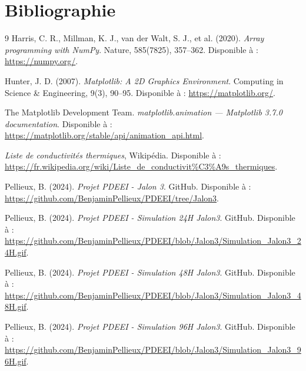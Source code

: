 \documentclass[a4paper,11pt]{article}
\begin{document}
\section*{Bibliographie}
\begin{thebibliography}{9}
    Harris, C. R., Millman, K. J., van der Walt, S. J., et al. (2020). \textit{Array programming with NumPy}. Nature, 585(7825), 357–362. Disponible à : \url{https://numpy.org/}.
    
    Hunter, J. D. (2007). \textit{Matplotlib: A 2D Graphics Environment}. Computing in Science \& Engineering, 9(3), 90–95. Disponible à : \url{https://matplotlib.org/}.

    The Matplotlib Development Team. \textit{matplotlib.animation — Matplotlib 3.7.0 documentation}. Disponible à : \url{https://matplotlib.org/stable/api/animation_api.html}.
    
    \textit{Liste de conductivités thermiques}, Wikipédia. Disponible à : \\ \url{https://fr.wikipedia.org/wiki/Liste_de_conductivit%C3%A9s_thermiques}.
    
    Pellieux, B. (2024). \textit{Projet PDEEI - Jalon 3}. GitHub. Disponible à : \\ \url{https://github.com/BenjaminPellieux/PDEEI/tree/Jalon3}.

    Pellieux, B. (2024). \textit{Projet PDEEI - Simulation 24H Jalon3}. GitHub. Disponible à : \\ \url{https://github.com/BenjaminPellieux/PDEEI/blob/Jalon3/Simulation_Jalon3_24H.gif}.
    
    Pellieux, B. (2024). \textit{Projet PDEEI - Simulation 48H Jalon3}. GitHub. Disponible à : \\ \url{https://github.com/BenjaminPellieux/PDEEI/blob/Jalon3/Simulation_Jalon3_48H.gif}.
    
    Pellieux, B. (2024). \textit{Projet PDEEI - Simulation 96H Jalon3}. GitHub. Disponible à : \\ \url{https://github.com/BenjaminPellieux/PDEEI/blob/Jalon3/Simulation_Jalon3_96H.gif}.
\end{thebibliography}
\end{document}
